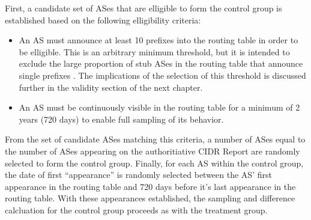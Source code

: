 First, a candidate set of ASes that are elligible to form the control group is
established based on the following elligibility criteria:

\begin{itemize}
    \item{An AS must announce at least 10 prefixes into the routing table in
    order to be elligible. This is an arbitrary minimum threshold, but it is
    intended to exclude the large proportion of stub ASes in the routing table
    that announce single prefixes \cite{6447-table-report}. The implications of
    the selection of this threshold is discussed further in the validity
    section of the next chapter.}
    \item{An AS must be continuously visible in the routing table for a minimum
    of 2 years (720 days) to enable full sampling of its behavior.}
\end{itemize}

From the set of candidate ASes matching this criteria, a number of ASes equal
to the number of ASes appearing on the authoritiative CIDR Report are randomly
selected to form the control group. Finally, for each AS within the control
group, the date of first ``appearance'' is randomly selected between the AS'
first appearance in the routing table and 720 days before it's last appearance
in the routing table. With these appearances established, the sampling and
difference calcluation for the control group proceeds as with the treatment
group.
